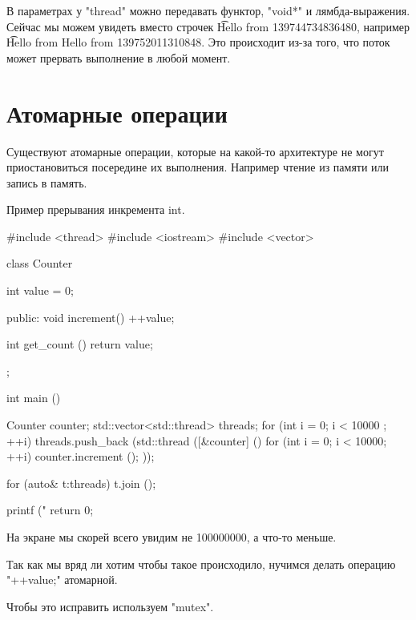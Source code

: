 В параметрах у \cpp"thread" можно передавать функтор, \cpp"void*" и лямбда-выражения.
Сейчас мы можем увидеть вместо строчек \t{Hello from 139744734836480}, например \t{Hello from Hello from 139752011310848}.
Это происходит из-за того, что поток может прервать выполнение в любой момент. 


\section{Атомарные операции}

Существуют атомарные операции, которые на какой-то архитектуре не могут приостановиться посередине их выполнения.
Например чтение из памяти или запись в память.

Пример прерывания инкремента int.

\begin{cppcode}
#include <thread>
#include <iostream>
#include <vector>

class Counter {
  int value = 0;

public:
  void increment() {
    ++value;
  }

  int get_count () {
    return value;
  }
};

int main () {
  Counter counter;
  std::vector<std::thread> threads;
  for (int i = 0; i < 10000 ; ++i) {
    threads.push_back (std::thread ([&counter] () {
        for (int i = 0; i < 10000; ++i) {
          counter.increment ();
        }
    }));
  }

  for (auto& t:threads) {
    t.join ();
  }

  printf ("%
  return 0;
}
\end{cppcode}

На экране мы скорей всего увидим не 100000000, а что-то меньше.

Так как мы вряд ли хотим чтобы такое происходило, нучимся делать операцию \cpp"++value;" атомарной.


Чтобы это исправить используем \cpp"mutex".

